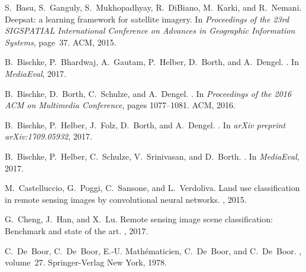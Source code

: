 \documentclass[journal]{IEEEtran}
\begin{document}
\begin{thebibliography}{1}


S.~Basu, S.~Ganguly, S.~Mukhopadhyay, R.~DiBiano, M.~Karki, and R.~Nemani.
\newblock Deepsat: a learning framework for satellite imagery.
\newblock In {\em Proceedings of the 23rd SIGSPATIAL International Conference
  on Advances in Geographic Information Systems}, page~37. ACM, 2015.

B.~Bischke, P.~Bhardwaj, A.~Gautam, P.~Helber, D.~Borth, and A.~Dengel.
.
\newblock In {\em MediaEval}, 2017.

B.~Bischke, D.~Borth, C.~Schulze, and A.~Dengel.
.
\newblock In {\em Proceedings of the 2016 ACM on Multimedia Conference}, pages
  1077--1081. ACM, 2016.

B.~Bischke, P.~Helber, J.~Folz, D.~Borth, and A.~Dengel.
.
\newblock In {\em arXiv preprint arXiv:1709.05932}, 2017.

B.~Bischke, P.~Helber, C.~Schulze, V.~Srinivasan, and D.~Borth.
.
\newblock In {\em MediaEval}, 2017.

M.~Castelluccio, G.~Poggi, C.~Sansone, and L.~Verdoliva.
\newblock Land use classification in remote sensing images by convolutional
  neural networks.
, 2015.

G.~Cheng, J.~Han, and X.~Lu.
\newblock Remote sensing image scene classification: Benchmark and state of the
  art.
, 2017.

C.~De~Boor, C.~De~Boor, E.-U. Math{\'e}maticien, C.~De~Boor, and C.~De~Boor.
, volume~27.
\newblock Springer-Verlag New York, 1978.


\end{thebibliography}
\end{document}
